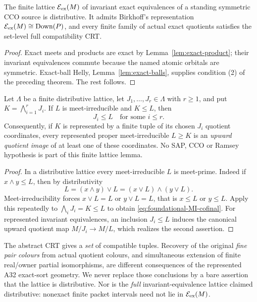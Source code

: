 \begin{corollary}
\label{lem:acf-exact-distributive}
The finite lattice $\mathcal E_{\rm ex}(M)$ of invariant exact
equivalences of a standing symmetric CCO source is distributive.
It admits Birkhoff's representation $\mathcal E_{\rm ex}(M)
\cong\operatorname{Down}(P)$, and every finite family of actual
exact quotients satisfies the set-level full compatibility CRT.
\end{corollary}
\begin{proof}
Exact meets and products are exact by
Lemma~\ref{lem:exact-product}; their invariant equivalences
commute because the named atomic orbitals are symmetric.
Exact-ball Helly, Lemma~\ref{lem:exact-balls}, supplies
condition (2) of the preceding theorem.  The rest follows.
\end{proof}

\begin{lemma}
\label{lem:foundational-MI-coordinate-cofinal}
Let $\Lambda$ be a finite distributive lattice, let
$J_1,\ldots,J_r\in\Lambda$ with $r\ge1$, and put
$K=\bigwedge_{i=1}^rJ_i$. If $L$ is meet-irreducible
and $K\le L$, then
\[
                        J_i\le L
 \quad\text{for some }i\le r.
 \tag{MI-C}\label{eq:foundational-MI-cofinal}
\]
Consequently, if $K$ is represented by a finite
tuple of its chosen $J_i$ quotient coordinates,
every represented proper meet-irreducible
$L\ge K$ is an \emph{upward quotient image}
of at least one of these coordinates.
No SAP, CCO or Ramsey hypothesis is part
of this finite lattice lemma.
\end{lemma}
\begin{proof}
In a distributive lattice every meet-irreducible
$L$ is meet-prime. Indeed if $x\wedge y\le L$,
then by distributivity
\[
 L=(x\wedge y)\vee L
   =(x\vee L)\wedge(y\vee L).
\]
Meet-irreducibility forces $x\vee L=L$
or $y\vee L=L$, that is $x\le L$ or
$y\le L$. Apply this repeatedly to
$\bigwedge_iJ_i=K\le L$ to obtain
\eqref{eq:foundational-MI-cofinal}.
For represented invariant equivalences,
an inclusion $J_i\le L$ induces the
canonical upward quotient map
$M/J_i\to M/L$, which realizes the
second assertion.
\end{proof}

\begin{remark}
The abstract CRT gives a \emph{set} of compatible tuples.
Recovery of the original \emph{fine pair colours} from actual
quotient colours, and simultaneous extension of finite real/owner
partial isomorphisms, are different consequences of the represented
A32 exact-sort geometry.  We never replace those conclusions by a
bare assertion that the lattice is distributive.  Nor is the
\emph{full} invariant-equivalence lattice claimed distributive:
nonexact finite packet intervals need not lie in
$\mathcal E_{\rm ex}(M)$.
\end{remark}

